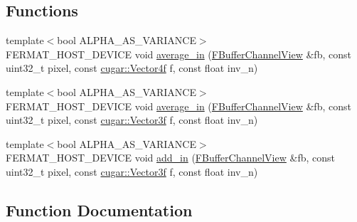 \subsection*{Functions}
\begin{DoxyCompactItemize}
\item 
{\footnotesize template$<$bool A\+L\+P\+H\+A\+\_\+\+A\+S\+\_\+\+V\+A\+R\+I\+A\+N\+CE$>$ }\\F\+E\+R\+M\+A\+T\+\_\+\+H\+O\+S\+T\+\_\+\+D\+E\+V\+I\+CE void \hyperlink{group___framebuffer_module_ga5dc81569ddc64436e1fe3638e3e031ce}{average\+\_\+in} (\hyperlink{struct_f_buffer_channel_view}{F\+Buffer\+Channel\+View} \&fb, const uint32\+\_\+t pixel, const \hyperlink{structcugar_1_1_vector}{cugar\+::\+Vector4f} f, const float inv\+\_\+n)
\item 
{\footnotesize template$<$bool A\+L\+P\+H\+A\+\_\+\+A\+S\+\_\+\+V\+A\+R\+I\+A\+N\+CE$>$ }\\F\+E\+R\+M\+A\+T\+\_\+\+H\+O\+S\+T\+\_\+\+D\+E\+V\+I\+CE void \hyperlink{group___framebuffer_module_ga27004dfdf67948b9846f3b70efbbca67}{average\+\_\+in} (\hyperlink{struct_f_buffer_channel_view}{F\+Buffer\+Channel\+View} \&fb, const uint32\+\_\+t pixel, const \hyperlink{structcugar_1_1_vector}{cugar\+::\+Vector3f} f, const float inv\+\_\+n)
\item 
{\footnotesize template$<$bool A\+L\+P\+H\+A\+\_\+\+A\+S\+\_\+\+V\+A\+R\+I\+A\+N\+CE$>$ }\\F\+E\+R\+M\+A\+T\+\_\+\+H\+O\+S\+T\+\_\+\+D\+E\+V\+I\+CE void \hyperlink{group___framebuffer_module_ga2649fc1c7712f02ca2a7391930e4b3e8}{add\+\_\+in} (\hyperlink{struct_f_buffer_channel_view}{F\+Buffer\+Channel\+View} \&fb, const uint32\+\_\+t pixel, const \hyperlink{structcugar_1_1_vector}{cugar\+::\+Vector3f} f, const float inv\+\_\+n)
\end{DoxyCompactItemize}


\subsection{Function Documentation}
\mbox{\label{group___framebuffer_module_ga2649fc1c7712f02ca2a7391930e4b3e8}} 
